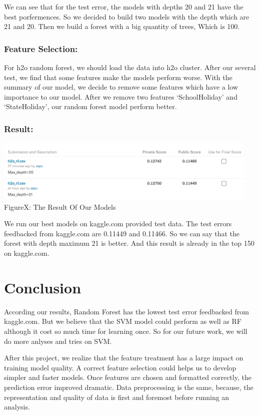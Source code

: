 \documentclass[12pt]{article}
\begin{document}
	We can see that for the test error, the models with depths 20 and 21 have the best porfermences. So we decided to build two models with the depth which are 21 and 20. Then we build a forest with a big quantity of trees, Which is 100.

	\subsubsection{Feature Selection:}

	For h2o random forest, we should load the data into h2o cluster. After our several test, we find that some features make the models perform worse. With the summary of our model, we decide to remove some features which have a low importance to our model. After we remove two features `SchoolHoliday' and `StateHoliday', our random forest model perform better.

	\subsubsection{Result:}

	\begin{center}
	\includegraphics[width=5in]{h2ores.png}\\
	FigureX: The Result Of Our Models
	\end{center}	

	We run our best models on kaggle.com provided test data. The test errors feedbacked	from kaggle.com are 0.11449 and 0.11466. So we can say that the forest with depth maximum 21 is better. And this result is already in the top 150 on kaggle.com. 
\newpage
\section{\textbf{Conclusion}}

According our results,  Random Forest has the lowest test error feedbacked from kaggle.com. But we believe that the SVM model could perform as well as RF although it cost so much time for learning once. So for our future work, we will do more anlyses and tries on SVM.

After this project, we realize that the feature treatment has a large impact on training model quality. A correct feature selection could helps us to develop simpler and faster models. Once features are chosen and formatted correctly, the prediction error improved dramatic. Data preprocessing is the same, because, the representation and quality of data is first and foremost before running an analysis. 
\end{document}
